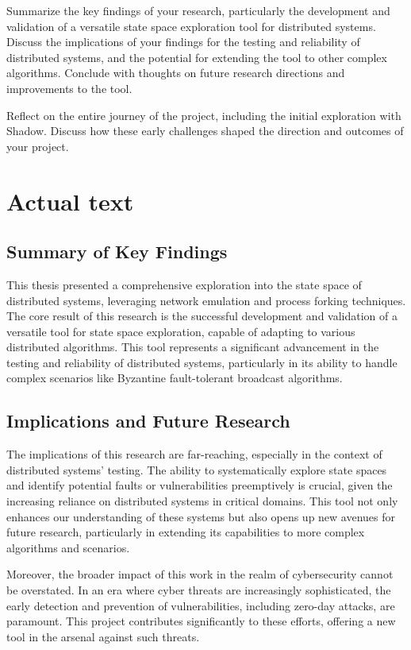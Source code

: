 \documentclass[a4paper,11pt,oneside]{report}
\begin{document}
Summarize the key findings of your research, particularly the development and validation of a versatile state space exploration tool for distributed systems. Discuss the implications of your findings for the testing and reliability of distributed systems, and the potential for extending the tool to other complex algorithms. Conclude with thoughts on future research directions and improvements to the tool.

Reflect on the entire journey of the project, including the initial exploration with Shadow. Discuss how these early challenges shaped the direction and outcomes of your project.

\section{Actual text}

\subsection{Summary of Key Findings}
This thesis presented a comprehensive exploration into the state space of distributed systems, leveraging network emulation and process forking techniques. The core result of this research is the successful development and validation of a versatile tool for state space exploration, capable of adapting to various distributed algorithms. This tool represents a significant advancement in the testing and reliability of distributed systems, particularly in its ability to handle complex scenarios like Byzantine fault-tolerant broadcast algorithms.

\subsection{Implications and Future Research}
The implications of this research are far-reaching, especially in the context of distributed systems' testing. The ability to systematically explore state spaces and identify potential faults or vulnerabilities preemptively is crucial, given the increasing reliance on distributed systems in critical domains. This tool not only enhances our understanding of these systems but also opens up new avenues for future research, particularly in extending its capabilities to more complex algorithms and scenarios.

Moreover, the broader impact of this work in the realm of cybersecurity cannot be overstated. In an era where cyber threats are increasingly sophisticated, the early detection and prevention of vulnerabilities, including zero-day attacks, are paramount. This project contributes significantly to these efforts, offering a new tool in the arsenal against such threats.
\end{document}
